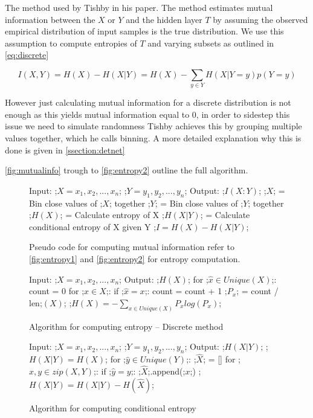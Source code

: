  The method used by Tishby in his paper. The method estimates mutual
  information between the $X$ or $Y$ and the hidden layer $T$ by assuming the
  observed empirical distribution of input samples is the true distribution. We
  use this assumption to compute entropies of $T$ and varying subsets as
  outlined in \autoref{eq:discrete}

\begin{equation}
  I(X, Y) = H(X) - H(X|Y) = H(X) - \sum _{y\in Y} H(X|Y = y)p(Y = y)
\label{eq:discrete}
\end{equation} 


  However just calculating mutual information for a discrete distribution is not
  enough as this yields mutual information equal to 0, in order to sidestep this
  issue we need to simulate randomness Tishby achieves this by grouping multiple
  values together, which he calls binning. A more detailed explanation why this
  is done is given in \autoref{ssection:detnet}

   \autoref{fig:mutualinfo} trough to \autoref{fig:entropy2} outline the full
   algorithm.
\begin{figure}[H]
    \begin{pythonfigure}
      Input: 
      ;$X = x_1, x_2,...,x_n$;
      ;$Y = y_1, y_2,...,y_n$;
      Output: ;$I(X:Y)$;
      ;$X$; = Bin close values of ;$X$; together
      ;$Y$; = Bin close values of ;$Y$; together
      ;$H(X)$; = Calculate entropy of X
      ;$H(X|Y)$; = Calculate conditional entropy of X given Y
      ;$I = H(X) - H(X|Y)$;
    \end{pythonfigure}
    \caption{Pseudo code for computing mutual information refer to
    \autoref{fig:entropy1} and \autoref{fig:entropy2} for entropy computation.}
    \label{fig:mutualinfo}
\end{figure}

\begin{figure}[H]
    \begin{pythonfigure}
      Input: ;$X = x_1, x_2,...,x_n$;
      Output: ;$H(X)$;
      for ;$ \hat{x}\in Unique(X)$;:
        count = 0       
        for ;$x \in X$;:
          if ;$\hat{x} = x$;:
            count = count + 1
        ;$P_x$; = count / len;$(X)$;
      ;$H(X) = - \sum _{x\in Unique(X)} P_x log(P_x)$; 
    \end{pythonfigure}
    \caption{Algorithm for computing entropy -- Discrete method}
    \label{fig:entropy1}
\end{figure} 

\begin{figure}[H]
    \begin{pythonfigure}
      Input: 
      ;$X = x_1, x_2,...,x_n$;
      ;$Y = y_1, y_2,...,y_n$;
      Output: ;$H(X|Y)$;
      ;$H(X|Y) = H(X)$;
      for ;$ \hat{y}\in Unique(Y)$;:
        ;$\hat{X}$; = []
        for ;$x, y \in zip(X, Y)$;:
          if ;$\hat{y} = y$;:
            ;$\hat{X}$;.append(;$x$;)
          ;$H(X|Y) = H(X|Y) - H(\hat{X})$;
    \end{pythonfigure}
    \caption{Algorithm for computing conditional entropy}
    \label{fig:entropy2}
\end{figure}

